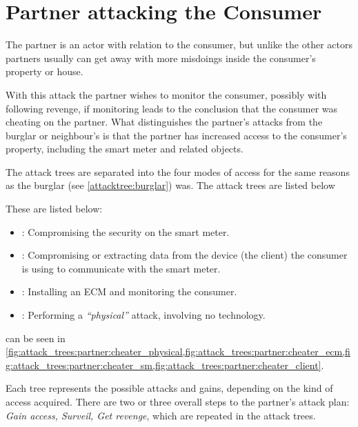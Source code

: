 
\section{Partner attacking the Consumer}
The partner is an actor with relation to the consumer, but unlike the other actors partners usually can get away with more misdoings inside the consumer's property or house.

With this attack the partner wishes to monitor the consumer, possibly with following revenge, if monitoring leads to the conclusion that the consumer was cheating on the partner.
What distinguishes the partner's attacks from the burglar or neighbour's is that the partner has increased access to the consumer's property, including the smart meter and related objects.

The attack trees are separated into the four modes of access for the same reasons as the burglar (see \cref{attacktree:burglar}) was.
The attack trees are listed below

These are listed below:
\begin{itemize}
  \item {}: Compromising the security on the smart meter.
  \item {}: Compromising or extracting data from the device (the client) the consumer is using to communicate with the smart meter.
  \item {}: Installing an ECM and monitoring the consumer.
  \item {}: Performing a \emph{``physical''} attack, involving no technology.
\end{itemize}
 can be seen in \cref{fig:attack_trees:partner:cheater_physical,fig:attack_trees:partner:cheater_ecm,fig:attack_trees:partner:cheater_sm,fig:attack_trees:partner:cheater_client}.

Each tree represents the possible attacks and gains, depending on the kind of access acquired.
There are two or three overall steps to the partner's attack plan: \textit{Gain access, Surveil, Get revenge}, which are repeated in the attack trees.

